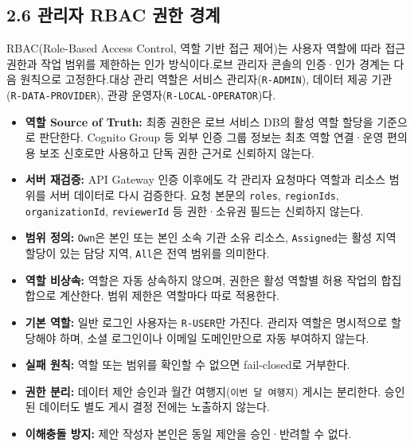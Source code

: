 \documentclass[12pt,a4paper]{article}
\newcommand{\DocNeedspace}[1]{\par\ifdim\dimexpr\pagegoal-\pagetotal\relax<#1\newpage\fi}
\begin{document}
\newpage
\DocNeedspace{24\baselineskip}
\subsection*{2.6 관리자 RBAC 권한 경계}


\DocNeedspace{3\baselineskip}
RBAC(Role-Based Access Control, 역할 기반 접근 제어)는 사용자 역할에 따라 접근 권한과 작업 범위를 제한하는 인가 방식이다.\newline 로브 관리자 콘솔의 인증·인가 경계는 다음 원칙으로 고정한다.\newline 대상 관리 역할은 서비스 관리자(\texttt{R-\allowbreak{}ADMIN}), 데이터 제공 기관(\texttt{R-\allowbreak{}DATA-\allowbreak{}PROVIDER}), 관광 운영자(\texttt{R-\allowbreak{}LOCAL-\allowbreak{}OPERATOR})다.


\begin{itemize}
\item \textbf{역할 Source of Truth:} 최종 권한은 로브 서비스 DB의 활성 역할 할당을 기준으로 판단한다. Cognito Group 등 외부 인증 그룹 정보는 최초 역할 연결·운영 편의용 보조 신호로만 사용하고 단독 권한 근거로 신뢰하지 않는다.
\item \textbf{서버 재검증:} API Gateway 인증 이후에도 각 관리자 요청마다 역할과 리소스 범위를 서버 데이터로 다시 검증한다. 요청 본문의 \texttt{roles}, \texttt{region\allowbreak{}Ids}, \texttt{organization\allowbreak{}Id}, \texttt{reviewer\allowbreak{}Id} 등 권한·소유권 필드는 신뢰하지 않는다.
\item \textbf{범위 정의:} \texttt{Own}은 본인 또는 본인 소속 기관 소유 리소스, \texttt{Assigned}는 활성 지역 할당이 있는 담당 지역, \texttt{All}은 전역 범위를 의미한다.
\item \textbf{역할 비상속:} 역할은 자동 상속하지 않으며, 권한은 활성 역할별 허용 작업의 합집합으로 계산한다. 범위 제한은 역할마다 따로 적용한다.
\item \textbf{기본 역할:} 일반 로그인 사용자는 \texttt{R-\allowbreak{}USER}만 가진다. 관리자 역할은 명시적으로 할당해야 하며, 소셜 로그인이나 이메일 도메인만으로 자동 부여하지 않는다.
\item \textbf{실패 원칙:} 역할 또는 범위를 확인할 수 없으면 fail-closed로 거부한다.
\item \textbf{권한 분리:} 데이터 제안 승인과 월간 여행지(\texttt{이번 달 여행지}) 게시는 분리한다. 승인된 데이터도 별도 게시 결정 전에는 노출하지 않는다.
\item \textbf{이해충돌 방지:} 제안 작성자 본인은 동일 제안을 승인·반려할 수 없다.
\end{itemize}
\end{document}
